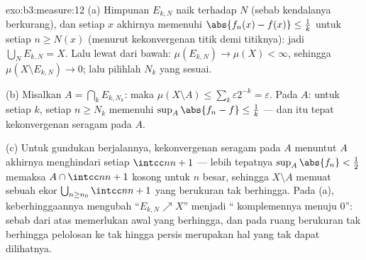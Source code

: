 \begin{solution}{exo:b3:measure:12}
(a) Himpunan $E_{k,N}$ naik terhadap $N$ (sebab kendalanya
berkurang), dan setiap $x$ akhirnya memenuhi $\abs{f_n(x)
- f(x)} \leq \frac1k$ untuk setiap $n \geq N(x)$ (menurut kekonvergenan
titik demi titiknya): jadi $\bigcup_NE_{k,N} = X$. Lalu lewat  dari bawah:
$\mu(E_{k,N}) \to \mu(X) < \infty$, sehingga $\mu(X\setminus
E_{k,N}) \to 0$; lalu pilihlah $N_k$ yang sesuai.

(b) Misalkan $A = \bigcap_kE_{k,N_k}$: maka $\mu(X\setminus A) \leq
\sum_k\varepsilon2^{-k} = \varepsilon$. Pada $A$: untuk setiap
$k$, setiap $n \geq N_k$ memenuhi $\sup_A\abs{f_n - f} \leq
\frac1k$ --- dan itu tepat kekonvergenan seragam pada $A$.

(c) Untuk gundukan berjalannya, kekonvergenan seragam pada $A$ menuntut
$A$ akhirnya menghindari setiap $\intcc n{n+1}$ --- lebih
tepatnya $\sup_A\abs{f_n} < \frac12$ memaksa $A \cap \intcc
n{n+1}$ kosong untuk $n$ besar, sehingga $X \setminus A$
memuat sebuah ekor $\bigcup_{n\geq n_0}\intcc n{n+1}$ yang
berukuran tak berhingga. Pada (a), keberhinggaannya mengubah
``$E_{k,N}\nearrow X$'' menjadi `` komplemennya
menuju $0$'': sebab  dari atas memerlukan awal yang berhingga,
dan pada ruang berukuran tak berhingga pelolosan ke tak hingga persis
merupakan hal yang tak dapat dilihatnya.
\end{solution}

